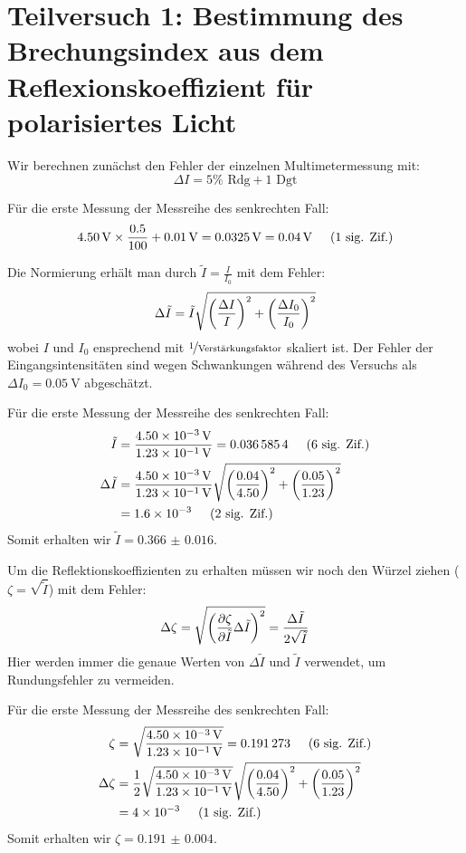 \section{Teilversuch 1: Bestimmung des Brechungsindex aus dem Reflexionskoeffizient für polarisiertes Licht}
	Wir berechnen zunächst den Fehler der einzelnen Multimetermessung mit:
	\begin{equation}
		\Delta I = 5\% \text{ Rdg} + 1 \text{ Dgt}
	\end{equation}
	\begin{beispiel}
		Für die erste Messung der Messreihe des senkrechten Fall:
		\begin{align}
			\SI{4.50}{\volt}\times\frac{0.5}{100} + \SI{0.01}{\volt} = \SI{0.0325}{\volt} = \SI{0.04}{\volt} \hspace{0.5cm}\text{(1 sig. Zif.)}
		\end{align}
	\end{beispiel}
	Die Normierung erhält man durch $\tilde{I} = \frac{I}{I_0}$ mit dem Fehler:
	\begin{align}
		\Delta \tilde{I} = \tilde{I}\relquad{I, I_0}
	\end{align}
	wobei $I$ und $I_0$ ensprechend mit $\nicefrac{1}{\text{Verstärkungsfaktor}}$ skaliert ist. Der Fehler der Eingangsintensitäten sind wegen Schwankungen während des Versuchs als $\Delta I_0 = \SI{0.05}{\volt}$ abgeschätzt. 
	\begin{beispiel}
		Für die erste Messung der Messreihe des senkrechten Fall:
		\begin{align}
			\tilde{I} &= \frac{\SI{4.50e-3}{\volt}}{\SI{1.23e-1}{\volt}} = \num{0.0365854} \hspace{0.5cm}\text{(6 sig. Zif.)} \\
			\Delta \tilde{I} &= 
			\frac{\SI{4.50e-3}{\volt}}{\SI{1.23e-1}{\volt}}\sqrt{
				\left(\frac{0.04}{4.50} \right)^2 +
				\left(\frac{0.05}{1.23} \right)^2
			} \notag \\
			&= \num{1.6e-3} \hspace{0.5cm}\text{(2 sig. Zif.)}
		\end{align}
		Somit erhalten wir $\tilde{I} = \num{0.366(16)}$.
	\end{beispiel}
	Um die Reflektionskoeffizienten zu erhalten müssen wir noch den Würzel ziehen ($\zeta = \sqrt{\tilde{I}}$) mit dem Fehler:
	\begin{align}
		\Delta \zeta = \gausserror{\zeta}{\tilde{I}} = \frac{\Delta \tilde{I}}{2\sqrt{\tilde{I}}}
	\end{align} Hier werden immer die genaue Werten von $\Delta \tilde{I}$ und $\tilde{I}$ verwendet, um Rundungsfehler zu vermeiden. 
	\begin{beispiel}
		Für die erste Messung der Messreihe des senkrechten Fall:
		\begin{align}
			\zeta &= \sqrt{\frac{\SI{4.50e-3}{\volt}}{\SI{1.23e-1}{\volt}}} = \num{0.191273} \hspace{0.5cm}\text{(6 sig. Zif.)} \\
			\Delta \zeta &= \frac{1}{2}
			\sqrt{\frac{\SI{4.50e-3}{\volt}}{\SI{1.23e-1}{\volt}}}\sqrt{
				\left(\frac{0.04}{4.50} \right)^2 +
				\left(\frac{0.05}{1.23} \right)^2
			} \notag \\
			&= \num{4e-3} \hspace{0.5cm}\text{(1 sig. Zif.)}
		\end{align}
		Somit erhalten wir $\zeta = \num{0.191(4)}$.
	\end{beispiel}

